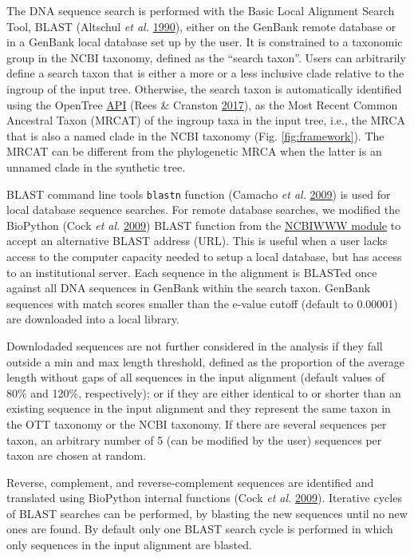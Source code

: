 \documentclass[]{article}
\begin{document}
The DNA sequence search is performed with the Basic Local Alignment Search Tool, BLAST (Altschul \emph{et al.} \protect\hyperlink{ref-altschul1990basic}{1990}), either on the GenBank remote database or in a GenBank local database set up by the user. It is constrained to a taxonomic group in the NCBI taxonomy, defined as the ``search taxon''. Users can arbitrarily define a search taxon that is either a more or a less inclusive
clade relative to the ingroup of the input tree.
Otherwise, the search taxon is automatically identified using the OpenTree \href{https://github.com/OpenTreeOfLife/germinator/wiki/Taxonomy-API-v3\#mrca}{API} (Rees \& Cranston \protect\hyperlink{ref-rees2017automated}{2017}), as the Most Recent Common Ancestral Taxon (MRCAT) of the ingroup taxa in the input tree, i.e., the MRCA that is also a named clade in the NCBI taxonomy (Fig. \ref{fig:framework}).
The MRCAT can be different from the phylogenetic MRCA when the latter is an unnamed clade in the synthetic tree.

BLAST command line tools \texttt{blastn} function (Camacho \emph{et al.} \protect\hyperlink{ref-camacho2009blast}{2009}) is used for local database sequence searches.
For remote database searches, we modified the BioPython (Cock \emph{et al.} \protect\hyperlink{ref-cock2009biopython}{2009}) BLAST function from the \href{https://biopython.org/DIST/docs/api/Bio.Blast.NCBIWWW-module.html}{NCBIWWW module} to accept an alternative BLAST address (URL). This is useful when a user lacks access to the computer capacity needed to setup a local database, but has access to an institutional server.
Each sequence in the alignment is BLASTed once against all DNA sequences in GenBank within the search taxon. GenBank sequences with match scores smaller than the e-value cutoff (default to 0.00001) are downloaded into a local library.

Downlodaded sequences are not further considered in the analysis if they fall outside a min and max length threshold, defined as the proportion of the average length without gaps of all sequences in the input alignment (default values of 80\% and 120\%, respectively); or if they are either identical to or shorter than an existing sequence in the input alignment and they represent the same taxon in the OTT taxonomy or the NCBI taxonomy.
If there are several sequences per taxon, an arbitrary number of 5 (can be modified by the user) sequences per taxon are chosen at random.

Reverse, complement, and reverse-complement sequences are identified and translated using BioPython internal functions (Cock \emph{et al.} \protect\hyperlink{ref-cock2009biopython}{2009}).
Iterative cycles of BLAST searches can be performed, by blasting the new sequences until no new ones are found. By default only one BLAST search cycle is performed in which only sequences in the input alignment are blasted.
\end{document}
